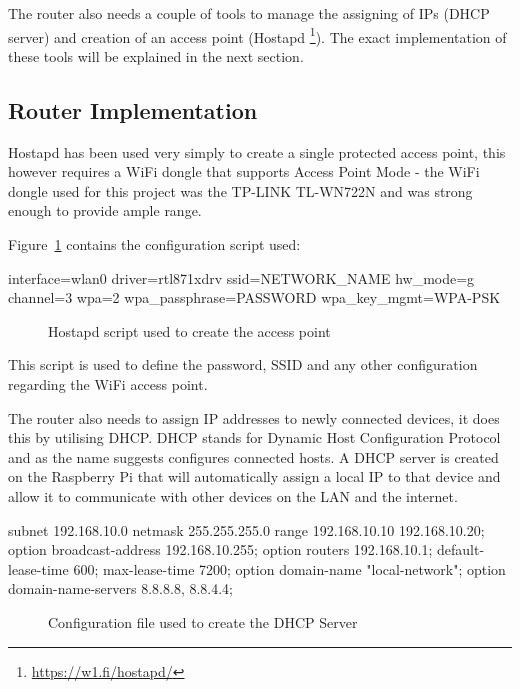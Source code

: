 The router also needs a couple of tools to manage the assigning of IPs (DHCP server) and creation of an access point (Hostapd \footnote{\url{https://w1.fi/hostapd/}}). The exact implementation of these tools will be explained in the next section.


\subsection{Router Implementation}
Hostapd has been used very simply to create a single protected access point, this however requires a WiFi dongle that supports Access Point Mode - the WiFi dongle used for this project was the TP-LINK TL-WN722N and was strong enough to provide ample range.

Figure~\ref{ref:Hostapd} contains the configuration script used:

\begin{center}
\begin{Scripts}{}
interface=wlan0
driver=rtl871xdrv
ssid=NETWORK_NAME
hw_mode=g
channel=3
wpa=2
wpa_passphrase=PASSWORD
wpa_key_mgmt=WPA-PSK
\end{Scripts}
	\begin{figure}[h]
		\caption{Hostapd script used to create the access point}
		\label{ref:Hostapd}
	\end{figure}
\end{center}

This script is used to define the password, SSID and any other configuration regarding the WiFi access point.

The router also needs to assign IP addresses to newly connected devices, it does this by utilising DHCP. DHCP stands for Dynamic Host Configuration Protocol and as the name suggests configures connected hosts. A DHCP server is created on the Raspberry Pi that will automatically assign a local IP to that device and allow it to communicate with other devices on the LAN and the internet.

\begin{center}
\begin{Scripts}{}
subnet 192.168.10.0 netmask 255.255.255.0 {
	range 192.168.10.10 192.168.10.20;
 	option broadcast-address 192.168.10.255;
 	option routers 192.168.10.1;
 	default-lease-time 600;
 	max-lease-time 7200;
 	option domain-name "local-network";
 	option domain-name-servers 8.8.8.8, 8.8.4.4;
}
\end{Scripts}
\begin{figure}[h]
	\caption{Configuration file used to create the DHCP Server}
	\label{ref:dhcp-server}
\end{figure}
\end{center}

